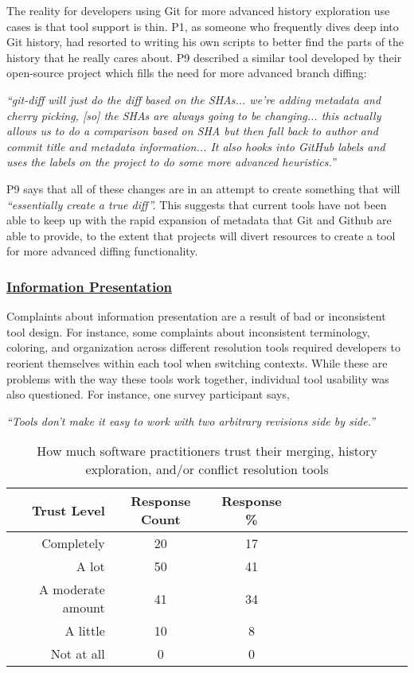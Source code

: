 The reality for developers using Git for more advanced history exploration use cases is that tool support is thin. P1, as someone who frequently dives deep into Git history, had resorted to writing his own scripts to better find the parts of the history that he really cares about. P9 described a similar tool developed by their open-source project which fills the need for more advanced branch diffing:
\begin{displayquote}
\textit{``git-diff will just do the diff based on the SHAs... we're adding metadata and cherry picking, [so] the SHAs are always going to be changing... this actually allows us to do a comparison based on SHA but then fall back to author and commit title and metadata information... It also hooks into GitHub labels and uses the labels on the project to do some more advanced heuristics.''}
\end{displayquote}

P9 says that all of these changes are in an attempt to create something that will \textit{``essentially create a true diff''.}
This suggests that current tools have not been able to keep up with the rapid expansion of metadata that Git and Github are able to provide, to the extent that projects will divert resources to create a tool for more advanced diffing functionality. 

\subsubsection{\underline{Information Presentation}}
Complaints about information presentation are a result of bad or inconsistent tool design. For instance, some complaints about inconsistent terminology, coloring, and organization across different resolution tools required developers to reorient themselves within each tool when switching contexts. While these are problems with the way these tools work together, individual tool usability was also questioned. For instance, one survey participant says, 
\begin{displayquote}
\textit{``Tools don't make it easy to work with two arbitrary revisions side by side.''}
\end{displayquote}


\begin{table}[!]
\renewcommand{\arraystretch}{1.3}
\caption{How much software practitioners trust their merging, history exploration, and/or conflict resolution tools}
\label{survey_tool_trust}
\centering
\begin{tabularx}{0.45\textwidth}{@{}r|*{10}{C}c@{}}
\toprule
Trust Level & Response Count & Response \%\\
\midrule
Completely & 20 & 17\\
A lot & 50 & 41\\
A moderate amount & 41 & 34\\
A little & 10 & 8\\
Not at all & 0 & 0\\
\bottomrule
\end{tabularx}
\end{table}


